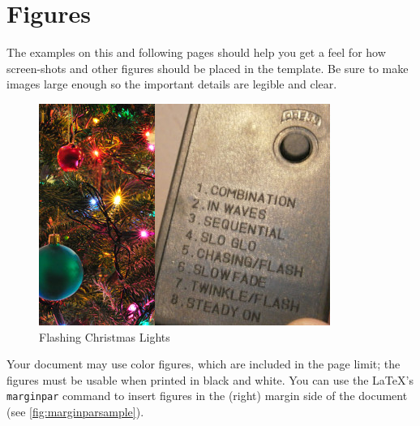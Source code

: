 \documentclass{chi-ext}
\begin{document}
\section{Figures}
The examples on this and following pages should help you get a feel for how screen-shots and other figures should be placed in the template. 
Be sure to make images large enough so the important details are legible and clear.



\begin{figure}
  \centering
  \includegraphics[width=\linewidth]{sample.jpg}
  \caption{Flashing Christmas Lights}
  \label{fig:sample}
\end{figure}

Your document may use color figures, which are included in the page limit; the figures must be usable when printed in black and white.
You can use the \LaTeX's \texttt{marginpar} command to insert figures in the (right) margin side of the document (see \autoref{fig:marginparsample}).

\end{document}
